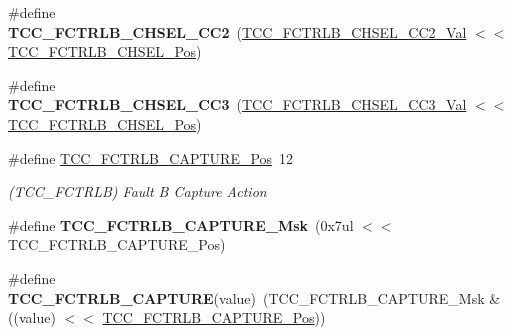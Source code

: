 \begin{DoxyCompactItemize}
\item 
\hypertarget{group___s_a_m_l21___t_c_c_ga73a7bf76e4b3e2428578471455f4e4f1}{}\#define {\bfseries T\+C\+C\+\_\+\+F\+C\+T\+R\+L\+B\+\_\+\+C\+H\+S\+E\+L\+\_\+\+C\+C2}~(\hyperlink{group___s_a_m_l21___t_c_c_ga773430cc474f09d65c1c0d5cae65386b}{T\+C\+C\+\_\+\+F\+C\+T\+R\+L\+B\+\_\+\+C\+H\+S\+E\+L\+\_\+\+C\+C2\+\_\+\+Val}      $<$$<$ \hyperlink{group___s_a_m_l21___t_c_c_ga6080af4e19870994e6c7f4170fb48da7}{T\+C\+C\+\_\+\+F\+C\+T\+R\+L\+B\+\_\+\+C\+H\+S\+E\+L\+\_\+\+Pos})\label{group___s_a_m_l21___t_c_c_ga73a7bf76e4b3e2428578471455f4e4f1}

\item 
\hypertarget{group___s_a_m_l21___t_c_c_ga301cbe9209904f24ff1b434c0b27d403}{}\#define {\bfseries T\+C\+C\+\_\+\+F\+C\+T\+R\+L\+B\+\_\+\+C\+H\+S\+E\+L\+\_\+\+C\+C3}~(\hyperlink{group___s_a_m_l21___t_c_c_gaba110aa38948afc54b119e596f4bc763}{T\+C\+C\+\_\+\+F\+C\+T\+R\+L\+B\+\_\+\+C\+H\+S\+E\+L\+\_\+\+C\+C3\+\_\+\+Val}      $<$$<$ \hyperlink{group___s_a_m_l21___t_c_c_ga6080af4e19870994e6c7f4170fb48da7}{T\+C\+C\+\_\+\+F\+C\+T\+R\+L\+B\+\_\+\+C\+H\+S\+E\+L\+\_\+\+Pos})\label{group___s_a_m_l21___t_c_c_ga301cbe9209904f24ff1b434c0b27d403}

\item 
\hypertarget{group___s_a_m_l21___t_c_c_gaf72ca0ec9e27e86144624bfb8d4ac36b}{}\#define \hyperlink{group___s_a_m_l21___t_c_c_gaf72ca0ec9e27e86144624bfb8d4ac36b}{T\+C\+C\+\_\+\+F\+C\+T\+R\+L\+B\+\_\+\+C\+A\+P\+T\+U\+R\+E\+\_\+\+Pos}~12\label{group___s_a_m_l21___t_c_c_gaf72ca0ec9e27e86144624bfb8d4ac36b}

\begin{DoxyCompactList}\small\item\em (T\+C\+C\+\_\+\+F\+C\+T\+R\+L\+B) Fault B Capture Action \end{DoxyCompactList}\item 
\hypertarget{group___s_a_m_l21___t_c_c_gacbbd18b69b01f2526ac2b02cb5bd10b6}{}\#define {\bfseries T\+C\+C\+\_\+\+F\+C\+T\+R\+L\+B\+\_\+\+C\+A\+P\+T\+U\+R\+E\+\_\+\+Msk}~(0x7ul $<$$<$ T\+C\+C\+\_\+\+F\+C\+T\+R\+L\+B\+\_\+\+C\+A\+P\+T\+U\+R\+E\+\_\+\+Pos)\label{group___s_a_m_l21___t_c_c_gacbbd18b69b01f2526ac2b02cb5bd10b6}

\item 
\hypertarget{group___s_a_m_l21___t_c_c_ga0c448af0609bb4f7e3df3ceaad864d0e}{}\#define {\bfseries T\+C\+C\+\_\+\+F\+C\+T\+R\+L\+B\+\_\+\+C\+A\+P\+T\+U\+R\+E}(value)~(T\+C\+C\+\_\+\+F\+C\+T\+R\+L\+B\+\_\+\+C\+A\+P\+T\+U\+R\+E\+\_\+\+Msk \& ((value) $<$$<$ \hyperlink{group___s_a_m_l21___t_c_c_gaf72ca0ec9e27e86144624bfb8d4ac36b}{T\+C\+C\+\_\+\+F\+C\+T\+R\+L\+B\+\_\+\+C\+A\+P\+T\+U\+R\+E\+\_\+\+Pos}))\label{group___s_a_m_l21___t_c_c_ga0c448af0609bb4f7e3df3ceaad864d0e}


\end{DoxyCompactItemize}
